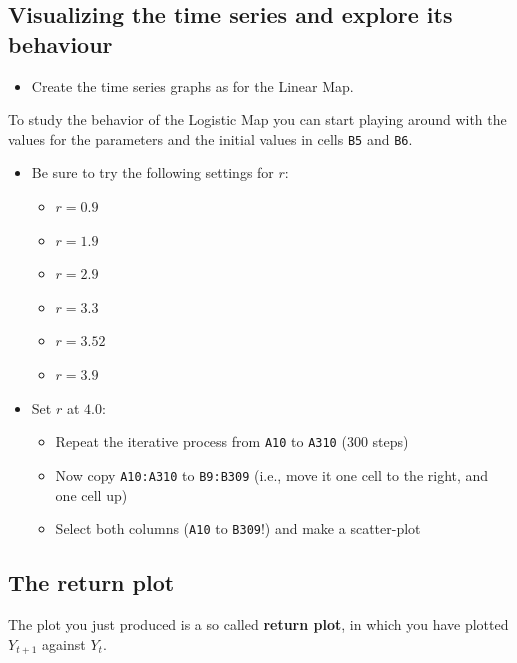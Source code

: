 \documentclass[]{book}
\providecommand{\tightlist}{%
  \setlength{\itemsep}{0pt}\setlength{\parskip}{0pt}}
\begin{document}
\subsection{Visualizing the time series and explore its
behaviour}\label{visualizing-the-time-series-and-explore-its-behaviour}

\begin{itemize}
\tightlist
\item
  Create the time series graphs as for the Linear Map.
\end{itemize}

To study the behavior of the Logistic Map you can start playing around
with the values for the parameters and the initial values in cells
\texttt{B5} and \texttt{B6}.

\begin{itemize}
\tightlist
\item
  Be sure to try the following settings for \(r\):

  \begin{itemize}
  \tightlist
  \item
    \(r = 0.9\)
  \item
    \(r = 1.9\)
  \item
    \(r = 2.9\)
  \item
    \(r = 3.3\)
  \item
    \(r = 3.52\)
  \item
    \(r = 3.9\)
  \end{itemize}
\item
  Set \(r\) at \(4.0\):

  \begin{itemize}
  \tightlist
  \item
    Repeat the iterative process from \texttt{A10} to \texttt{A310} (300
    steps)
  \item
    Now copy \texttt{A10:A310} to \texttt{B9:B309} (i.e., move it one
    cell to the right, and one cell up)
  \item
    Select both columns (\texttt{A10} to \texttt{B309}!) and make a
    scatter-plot
  \end{itemize}
\end{itemize}

\hypertarget{the-return-plot}{\subsection{The return
plot}\label{the-return-plot}}

The plot you just produced is a so called \textbf{return plot}, in which
you have plotted \(Y_{t+1}\) against \(Y_t\).
\end{document}
